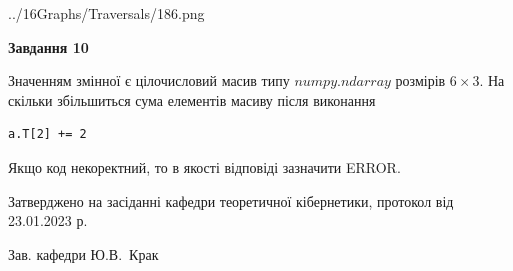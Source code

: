 \documentclass[12pt, ukrainian]{article}
\begin{document}
{\begin {large}
\begin{center}
	{../16Graphs/Traversals/186.png}
\end{center}\par
\newpage

{\begin {center}\textbf{Завдання 10}\end {center}}\par
Значенням змінної  є цілочисловий масив типу $numpy.ndarray$ розмірів $6{\times}3$. На скільки збільшиться сума елементів масиву  після виконання
\begin{verbatim}
a.T[2] += 2
\end{verbatim}


Якщо код некоректний, то в якості відповіді зазначити ERROR.\par
\newpage


\end {large}
}
{\smallskip \begin {small} Затверджено на засіданні кафедри теоретичної кібернетики, протокол  від   23.01.2023 р.\par\smallskip\smallskip
{\parbox {6.5 cm}{Зав. кафедри \dotfill Ю.В.~Крак}} \end{small}}
\end{document}
